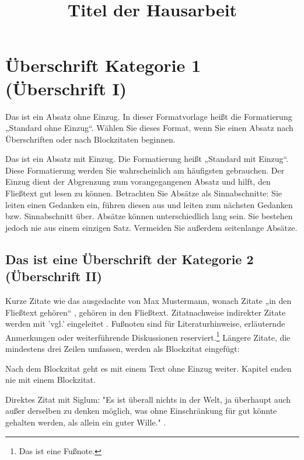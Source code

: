 \documentclass{hausarbeit_philosophie}
\title{Titel der Hausarbeit}
\begin{document}
\maketitle
\tableofcontents
\newpage

\section{Überschrift Kategorie 1 (Überschrift I)}
Das ist ein Absatz ohne Einzug. In dieser Formatvorlage heißt die Formatierung „Standard ohne Einzug“. Wählen Sie dieses Format, wenn Sie einen Absatz nach Überschriften oder nach Blockzitaten beginnen.

Das ist ein Absatz mit Einzug. Die Formatierung heißt „Standard mit Einzug“. Diese Formatierung werden Sie wahrscheinlich am häufigsten gebrauchen. Der Einzug dient der Abgrenzung zum vorangegangenen Absatz und hilft, den Fließtext gut lesen zu können. Betrachten Sie Absätze als Sinnabschnitte: Sie leiten einen Gedanken ein, führen diesen aus und leiten zum nächsten Gedanken bzw. Sinnabschnitt über. Absätze können unterschiedlich lang sein. Sie bestehen jedoch nie aus einem einzigen Satz. Vermeiden Sie außerdem seitenlange Absätze.

\subsection{Das ist eine Überschrift der Kategorie 2 (Überschrift II)}
Kurze Zitate wie das ausgedachte von Max Mustermann, wonach Zitate „in den Fließtext gehören“ \cite[14]{MusZit}, gehören in den Fließtext. Zitatnachweise indirekter Zitate werden mit 'vgl.' eingeleitet . Fußnoten sind für Literaturhinweise, erläuternde Anmerkungen oder weiterführende Diskussionen reserviert.\footnote{Das ist eine Fußnote.} Längere Zitate, die mindestens drei Zeilen umfassen, werden als Blockzitat eingefügt:


Nach dem Blockzitat geht es mit einem Text ohne Einzug weiter. Kapitel enden nie mit einem Blockzitat.

Direktes Zitat mit Siglum: "Es ist überall nichts in der Welt, ja überhaupt auch außer derselben zu denken möglich, was ohne Einschränkung für gut könnte gehalten werden, als allein ein guter Wille." \cite[393]{GMS}.

\printbibliography
\end{document}
